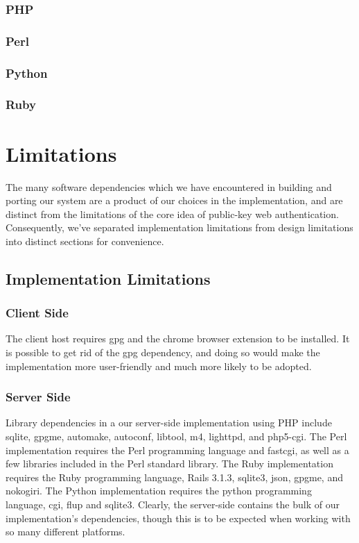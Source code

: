 \documentclass[11pt]{article}
\begin{document}
\subsubsection{PHP}
\subsubsection{Perl}
\subsubsection{Python}
\subsubsection{Ruby}

\section{Limitations} \label{sec:limitations}
The many software dependencies which we have encountered in building and porting our system are a product of our choices in the implementation, and are distinct from the limitations of the core idea of public-key web authentication.  Consequently, we've separated implementation limitations from design limitations into distinct sections for convenience.

\subsection{Implementation Limitations}
\subsubsection{Client Side}
The client host requires gpg and the chrome browser extension to be installed.  It is possible to get rid of the gpg dependency, and doing so would make the implementation more user-friendly and much more likely to be adopted.
\subsubsection{Server Side}
Library dependencies in a our server-side implementation using PHP include sqlite, gpgme, automake, autoconf, libtool, m4, lighttpd, and php5-cgi.  The Perl implementation requires the Perl programming language and fastcgi, as well as a few libraries included in the Perl standard library.  The Ruby implementation requires the Ruby programming language, Rails 3.1.3, sqlite3, json, gpgme, and nokogiri.  The Python implementation requires the python programming language, cgi, flup and sqlite3.  Clearly, the server-side contains the bulk of our implementation's dependencies, though this is to be expected when working with so many different platforms.
\end{document}

